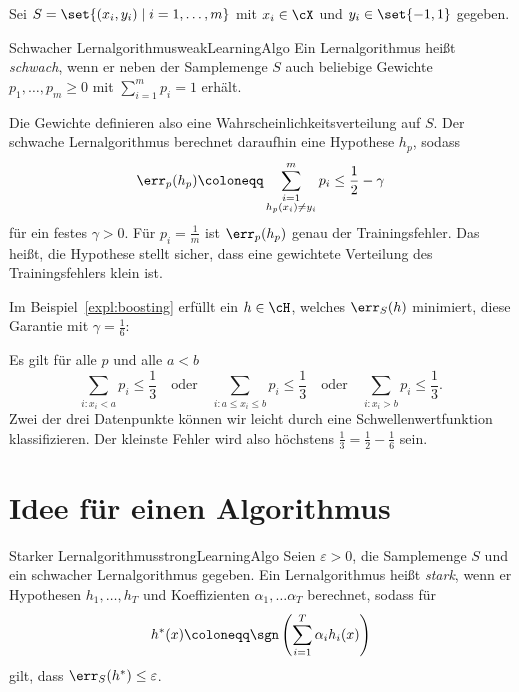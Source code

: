 \documentclass[language=ngerman,algolist,acrolist]{TemplateLecture}
\begin{document}
Sei $S = \set{(x_i, y_i) \mid i = 1, \ldots, m}$ mit $x_i \in \cX$ und $y_i \in \set{-1, 1}$ gegeben. 
\begin{defi}{Schwacher Lernalgorithmus}{weakLearningAlgo}
    Ein Lernalgorithmus heißt \emph{schwach}, wenn er neben der Samplemenge $S$ auch beliebige Gewichte $p_1, \ldots, p_m \geq 0$ mit $\sum_{i = 1}^m p_i = 1$ erhält. 
\end{defi}
Die Gewichte definieren also eine Wahrscheinlichkeitsverteilung auf $S$. Der schwache Lernalgorithmus berechnet daraufhin eine Hypothese $h_p$, sodass 
\begin{equation*}
    \err_p(h_p) \coloneqq \sum_{\substack{i = 1 \\ h_p(x_i) \neq y_i}}^m p_i \leq \frac{1}{2} - \gamma
\end{equation*}
für ein festes $\gamma > 0$. Für $p_i = \frac{1}{m}$ ist $\err_p(h_p)$ genau der Trainingsfehler. Das heißt, die Hypothese stellt sicher, dass eine gewichtete Verteilung des Trainingsfehlers klein ist.

\begin{expl}
    Im Beispiel~\ref{expl:boosting} erfüllt ein $h \in \cH$, welches $\err_S(h)$ minimiert, diese Garantie mit $\gamma = \frac{1}{6}$:

    Es gilt für alle $p$ und alle $a < b$
    \begin{equation*}
        \sum_{i : x_i < a} p_i \leq \frac{1}{3} \quad \text{oder} \quad \sum_{i: a \leq x_i \leq b} p_i \leq \frac{1}{3} \quad \text{oder} \quad \sum_{i: x_i > b} p_i \leq \frac{1}{3}.
    \end{equation*}
    Zwei der drei Datenpunkte können wir leicht durch eine Schwellenwertfunktion klassifizieren. Der kleinste Fehler wird also höchstens $\frac{1}{3} = \frac{1}{2} - \frac{1}{6}$ sein.
\end{expl}

\section{Idee für einen Algorithmus}

\begin{defi}{Starker Lernalgorithmus}{strongLearningAlgo}
    Seien $\varepsilon > 0$, die Samplemenge $S$ und ein schwacher Lernalgorithmus gegeben. Ein Lernalgorithmus heißt \emph{stark}, wenn er Hypothesen $h_1, \ldots, h_T$ und Koeffizienten $\alpha_1, \ldots \alpha_T$ berechnet, sodass für
    \begin{equation*}
        h^*(x) \coloneqq \sgn\left( \sum_{i = 1}^T \alpha_i h_i(x)\right)
    \end{equation*}
    gilt, dass $\err_S(h^*) \leq \varepsilon$.
\end{defi}
\end{document}
